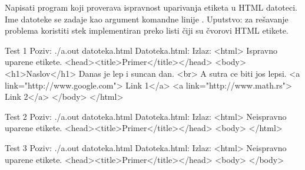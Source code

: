 \begin{Exercise}[label=604]
Napisati program koji proverava ispravnost uparivanja etiketa u HTML datoteci. Ime datoteke se zadaje kao argument komandne linije . 
Uputstvo: za rešavanje problema koristiti stek implementiran preko listi čiji su čvorovi HTML etikete.

\begin{maxitest}
    \begin{test}{Test 1}
Poziv: ./a.out datoteka.html
Datoteka.html:                          Izlaz:
<html>                                  Ispravno uparene etikete.
  <head><title>Primer</title></head>               
  <body>                                           
    <h1>Naslov</h1>                                
    Danas je lep i suncan dan. <br>                
    A sutra ce biti jos lepsi.     
    <a link="http://www.google.com"> Link 1</a>    
    <a link="http://www.math.rs"> Link 2</a>
  </body>
</html>
    \end{test}
\end{maxitest}

\begin{maxitest}    
  \begin{test}{Test 2}
Poziv: ./a.out datoteka.html
Datoteka.html:                          Izlaz:
<html>                                  Neispravno uparene etikete.
  <head><title>Primer</title></head>               
  <body>  
</html>
  \end{test}
\end{maxitest}

\begin{maxitest}      
  \begin{test}{Test 3}
Poziv: ./a.out datoteka.html
Datoteka.html:                          Izlaz:
<html>                                  Neispravno uparene etikete.
  <head><title>Primer</title></head>               
  <body>  
  </body>
  \end{test}
\end{maxitest}

\end{Exercise}
\begin{Answer}[ref=604]
\end{Answer}



